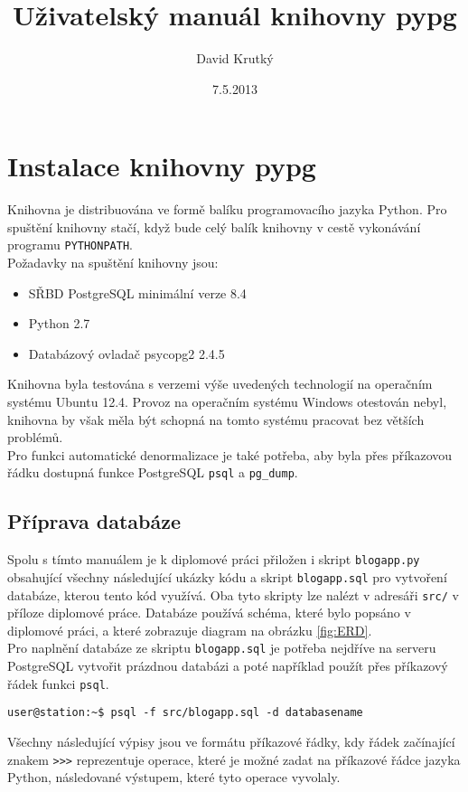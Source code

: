 \documentclass[11pt]{article}
\title{Uživatelský manuál knihovny pypg}
\date{7.5.2013}
\author{David Krutký}
\begin{document}
         
\maketitle

\section{Instalace knihovny pypg}

Knihovna je distribuována ve formě balíku programovacího jazyka Python. Pro spuštění knihovny stačí, když bude celý balík knihovny v cestě vykonávání programu \lstinline[style=inline]|PYTHONPATH|. \\
Požadavky na spuštění knihovny jsou:
\begin{itemize}
\item SŘBD PostgreSQL minimální verze 8.4
\item Python 2.7
\item Databázový ovladač psycopg2 2.4.5
\end{itemize}
Knihovna byla testována s verzemi výše uvedených technologií na operačním systému Ubuntu 12.4. Provoz na operačním systému Windows otestován nebyl, knihovna by však měla být schopná na tomto systému pracovat bez větších problémů. \\
Pro funkci automatické denormalizace je také potřeba, aby byla přes příkazovou řádku dostupná funkce PostgreSQL \lstinline[style=inline]|psql| a \lstinline[style=inline]|pg_dump|.
\subsection{Příprava databáze}
Spolu s tímto manuálem je k diplomové práci přiložen i skript \lstinline[style=inline]|blogapp.py| obsahující všechny následující ukázky kódu a skript \lstinline[style=inline]|blogapp.sql| pro vytvoření databáze, kterou tento kód využívá. Oba tyto skripty lze nalézt v adresáři \lstinline[style=inline]|src/| v příloze diplomové práce. Databáze používá schéma, které bylo popsáno v diplomové práci, a které zobrazuje diagram na obrázku \ref{fig:ERD}. \\
Pro naplnění databáze ze skriptu \lstinline[style=inline]|blogapp.sql| je potřeba nejdříve na serveru PostgreSQL vytvořit prázdnou databázi a poté například použít přes příkazový řádek funkci \lstinline[style=inline]|psql|. 
\begin{lstlisting}[style=python]
user@station:~$ psql -f src/blogapp.sql -d databasename
\end{lstlisting}
Všechny následující výpisy jsou ve formátu příkazové řádky, kdy řádek začínající znakem \lstinline[style=inline]|>>>| reprezentuje operace, které je možné zadat na příkazové řádce jazyka Python, následované výstupem, které tyto operace vyvolaly.
\end{document}
